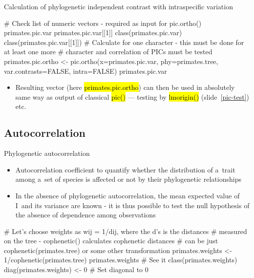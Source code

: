 \documentclass[compress, ucs, xelatex, 11pt, xcolor=svgnames,
	hyperref={
		bookmarks=true,
		unicode=true,
		colorlinks=true,
		pdftitle={Molecular data in R},
		plainpages=false,
		pdfauthor={Vojtech Zeisek},
		pdfsubject={Course about phylogeny and evolution in R},
		pdfcreator={XeLaTeX},
		pdfkeywords={R, evolution, phylogeny, molecular data},
		linkcolor=Tomato,
		anchorcolor=SaddleBrown,
		citecolor=Goldenrod,
		filecolor=DarkMagenta,
		menucolor=Sienna,
		urlcolor=DarkTurquoise,
		pdftex},
	url={hyphens, lowtilde} %
	]{beamer}
\renewcommand{\texttt}[1]{\hl{\ttfamily #1}}
\begin{document}
\begin{frame}[fragile]{Calculation of phylogenetic independent contrast with intraspecific variation}
	\begin{spluscode}
    # Check list of numeric vectors - required as input for pic.ortho()
    primates.pic.var
    primates.pic.var[[1]]
    class(primates.pic.var)
    class(primates.pic.var[[1]])
    # Calculate for one character - this must be done for at least one more
    # character and correlation of PICs must be tested
    primates.pic.ortho <- pic.ortho(x=primates.pic.var, phy=primates.tree,
      var.contrasts=FALSE, intra=FALSE)
    primates.pic.var
	\end{spluscode}
	\begin{itemize}
		\item Resulting vector (here \texttt{primates.pic.ortho}) can then be used in absolutely same way as output of classical \texttt{pic()} --- testing by \texttt{lmorigin()} (slide~\ref{pic-test}) etc.
	\end{itemize}
\end{frame}

\subsection{Autocorrelation}

\begin{frame}[fragile]{Phylogenetic autocorrelation}
	\begin{itemize}
		\item Autocorrelation coefficient to quantify whether the distribution of a~trait among a~set of species is affected or not by their phylogenetic relationships
		\item In the absence of phylogenetic autocorrelation, the mean expected value of I~and its variance are known - it is thus possible to test the null hypothesis of the absence of dependence among observations
	\end{itemize}
	\begin{spluscode}
    # Let's choose weights as wij = 1/dij, where the d’s is the distances
    # measured on the tree - cophenetic() calculates cophenetic distances
    # can be just cophenetic(primates.tree) or some other transformation
    primates.weights <- 1/cophenetic(primates.tree)
    primates.weights # See it
    class(primates.weights)
    diag(primates.weights) <- 0 # Set diagonal to 0
	\end{spluscode}
\end{frame}
\end{document}
